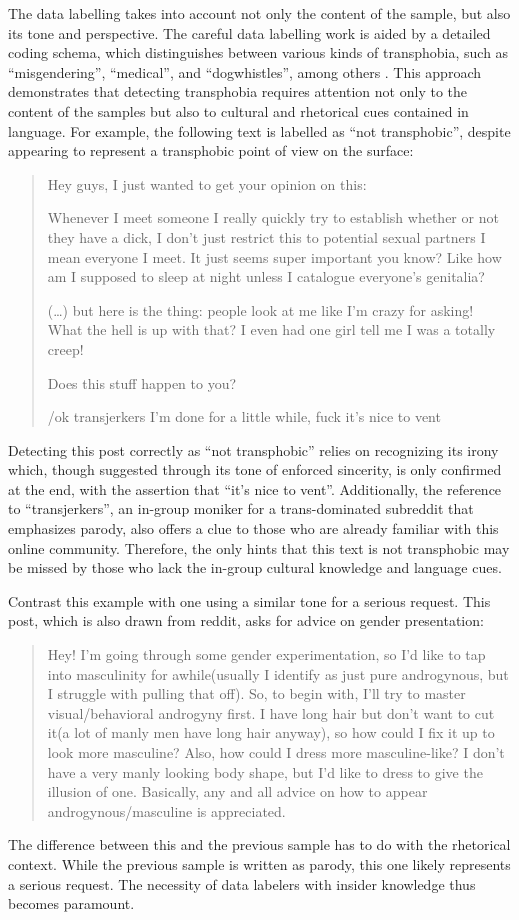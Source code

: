 \documentclass[anonymous,review]{acmart}
\begin{document}
The data labelling takes into account not only the content of the sample, but also its tone and perspective. The careful data labelling work is aided by a detailed coding schema, which distinguishes between various kinds of transphobia, such as “misgendering”, “medical”, and “dogwhistles”, among others \citep{lameiro:2025}. This approach demonstrates that detecting transphobia requires attention not only to the content of the samples but also to cultural and rhetorical cues contained in language. For example, the following text is labelled as “not transphobic”, despite appearing to represent a transphobic point of view on the surface:
\begin{quote}
Hey guys, I just wanted to get your opinion on this:

Whenever I meet someone I really quickly try to establish whether or not they have a dick, I don’t just restrict this to potential sexual partners I mean everyone I meet. It just seems super important you know? Like how am I supposed to sleep at night unless I catalogue everyone’s genitalia?

(…) but here is the thing: people look at me like I’m crazy for asking! What the hell is up with that? I even had one girl tell me I was a totally creep!

Does this stuff happen to you?

/ok transjerkers I’m done for a little while, fuck it’s nice to vent
\end{quote}
Detecting this post correctly as “not transphobic” relies on recognizing its irony which, though suggested through its tone of enforced sincerity, is only confirmed at the end, with the assertion that “it’s nice to vent”. Additionally, the reference to “transjerkers”, an in-group moniker for a trans-dominated subreddit that emphasizes parody, also offers a clue to those who are already familiar with this online community. Therefore, the only hints that this text is not transphobic may be missed by those who lack the in-group cultural knowledge and language cues.

Contrast this example with one using a similar tone for a serious request. This post, which is also drawn from reddit, asks for advice on gender presentation:
\begin{quote}
Hey! I’m going through some gender experimentation, so I’d like to tap into masculinity for awhile(usually I identify as just pure androgynous, but I struggle with pulling that off). So, to begin with, I’ll try to master visual/behavioral androgyny first. I have long hair but don’t want to cut it(a lot of manly men have long hair anyway), so how could I fix it up to look more masculine? Also, how could I dress more masculine-like? I don’t have a very manly looking body shape, but I’d like to dress to give the illusion of one. Basically, any and all advice on how to appear androgynous/masculine is appreciated.
\end{quote}
The difference between this and the previous sample has to do with the rhetorical context. While the previous sample is written as parody, this one likely represents a serious request. The necessity of data labelers with insider knowledge thus becomes paramount.
\end{document}
